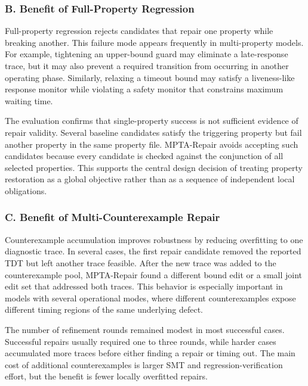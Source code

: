 \documentclass[
]{article}
\begin{document}
\subsubsection{B. Benefit of Full-Property
Regression}\label{b.-benefit-of-full-property-regression}

Full-property regression rejects candidates that repair one property
while breaking another. This failure mode appears frequently in
multi-property models. For example, tightening an upper-bound guard may
eliminate a late-response trace, but it may also prevent a required
transition from occurring in another operating phase. Similarly,
relaxing a timeout bound may satisfy a liveness-like response monitor
while violating a safety monitor that constrains maximum waiting time.

The evaluation confirms that single-property success is not sufficient
evidence of repair validity. Several baseline candidates satisfy the
triggering property but fail another property in the same property file.
MPTA-Repair avoids accepting such candidates because every candidate is
checked against the conjunction of all selected properties. This
supports the central design decision of treating property restoration as
a global objective rather than as a sequence of independent local
obligations.

\subsubsection{C. Benefit of Multi-Counterexample
Repair}\label{c.-benefit-of-multi-counterexample-repair}

Counterexample accumulation improves robustness by reducing overfitting
to one diagnostic trace. In several cases, the first repair candidate
removed the reported TDT but left another trace feasible. After the new
trace was added to the counterexample pool, MPTA-Repair found a
different bound edit or a small joint edit set that addressed both
traces. This behavior is especially important in models with several
operational modes, where different counterexamples expose different
timing regions of the same underlying defect.

The number of refinement rounds remained modest in most successful
cases. Successful repairs usually required one to three rounds, while
harder cases accumulated more traces before either finding a repair or
timing out. The main cost of additional counterexamples is larger SMT
and regression-verification effort, but the benefit is fewer locally
overfitted repairs.
\end{document}
